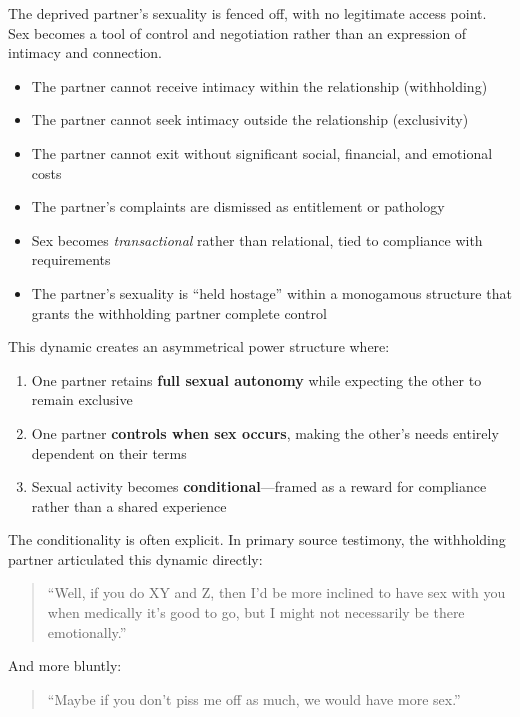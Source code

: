 \documentclass[12pt,openany]{book}
\numberwithin{equation}{chapter}
\begin{document}
The deprived partner's sexuality is fenced off, with no legitimate access point. Sex becomes a tool of control and negotiation rather than an expression of intimacy and connection.

\begin{itemize}
    \item The partner cannot receive intimacy within the relationship (withholding)
    \item The partner cannot seek intimacy outside the relationship (exclusivity)
    \item The partner cannot exit without significant social, financial, and emotional costs
    \item The partner's complaints are dismissed as entitlement or pathology
    \item Sex becomes \textit{transactional} rather than relational, tied to compliance with requirements
    \item The partner's sexuality is ``held hostage'' within a monogamous structure that grants the withholding partner complete control
\end{itemize}

This dynamic creates an asymmetrical power structure where:

\begin{enumerate}
    \item One partner retains \textbf{full sexual autonomy} while expecting the other to remain exclusive
    \item One partner \textbf{controls when sex occurs}, making the other's needs entirely dependent on their terms
    \item Sexual activity becomes \textbf{conditional}---framed as a reward for compliance rather than a shared experience
\end{enumerate}

The conditionality is often explicit. In primary source testimony, the withholding partner articulated this dynamic directly:

\begin{quote}
``Well, if you do XY and Z, then I'd be more inclined to have sex with you when medically it's good to go, but I might not necessarily be there emotionally.''
\end{quote}

And more bluntly:

\begin{quote}
``Maybe if you don't piss me off as much, we would have more sex.''
\end{quote}
\end{document}
